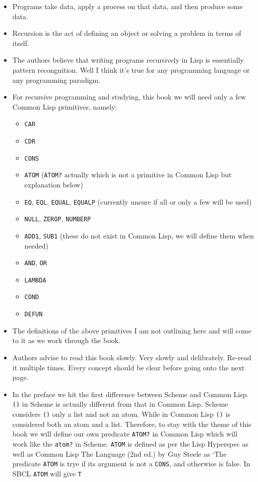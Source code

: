 \documentclass[11pt]{article}
\begin{document}
\begin{itemize}
\item Programs take data, apply a process on that data, and then produce some data.
\item Recursion is the act of defining an object or solving a problem in terms of itself.
\item The authors believe that writing programs recursively in Lisp is essentially pattern recongnition. Well I think
it's true for any programming language or any programming paradigm.
\item For recursive programming and studying, this book we will need only a few Common Lisp primitives, namely:
\begin{itemize}
\item \texttt{CAR}
\item \texttt{CDR}
\item \texttt{CONS}
\item \texttt{ATOM} (\texttt{ATOM?} actually which is not a primitive in Common Lisp but explanation below)
\item \texttt{EQ}, \texttt{EQL}, \texttt{EQUAL}, \texttt{EQUALP} (currently unsure if all or only a few will be used)
\item \texttt{NULL}, \texttt{ZEROP}, \texttt{NUMBERP}
\item \texttt{ADD1}, \texttt{SUB1} (these do not exist in Common Lisp, we will define them when needed)
\item \texttt{AND}, \texttt{OR}
\item \texttt{LAMBDA}
\item \texttt{COND}
\item \texttt{DEFUN}
\end{itemize}
\item The definitions of the above primitives I am not outlining here and will come to it as we work through the book.
\item Authors advise to read this book slowly. Very slowly and delibrately. Re-read it multiple times. Every concept should
be clear before going onto the next page.
\item In the preface we hit the first difference between Scheme and Common Lisp. \texttt{()} in Scheme is actually different from that in
Common Lisp. Scheme considers \texttt{()} only a list and not an atom. While in Common Lisp \texttt{()} is considered both an atom and a
list. Therefore, to stay with the theme of this book we will define our own predicate \texttt{ATOM?} in Common Lisp which
will work like the \texttt{atom?} in Scheme. \texttt{ATOM} is defined as per the Lisp Hyperspec as well as Common Lisp The
Language (2nd ed.) by Guy Steele as `The predicate \texttt{ATOM} is trye if its argument is not a \texttt{CONS}, and otherwise is
false.
In SBCL  \texttt{ATOM} will give \texttt{T}


\end{itemize}
\end{document}
